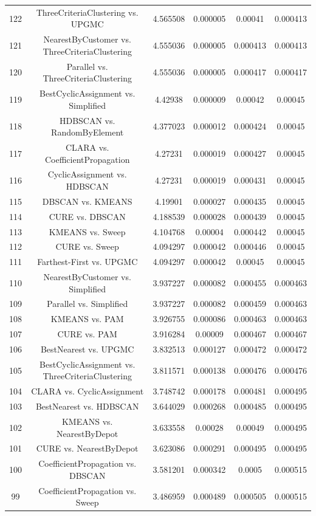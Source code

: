 \documentclass[a4paper,10pt]{article}
\begin{document}
\begin{landscape}
\begin{table}[!htp]
\begin{tabular}{cccccc}
122&ThreeCriteriaClustering vs. UPGMC&4.565508&0.000005&0.00041&0.000413\\
121&NearestByCustomer vs. ThreeCriteriaClustering&4.555036&0.000005&0.000413&0.000413\\
120&Parallel vs. ThreeCriteriaClustering&4.555036&0.000005&0.000417&0.000417\\
119&BestCyclicAssignment vs. Simplified&4.42938&0.000009&0.00042&0.00045\\
118&HDBSCAN vs. RandomByElement&4.377023&0.000012&0.000424&0.00045\\
117&CLARA vs. CoefficientPropagation&4.27231&0.000019&0.000427&0.00045\\
116&CyclicAssignment vs. HDBSCAN&4.27231&0.000019&0.000431&0.00045\\
115&DBSCAN vs. KMEANS&4.19901&0.000027&0.000435&0.00045\\
114&CURE vs. DBSCAN&4.188539&0.000028&0.000439&0.00045\\
113&KMEANS vs. Sweep&4.104768&0.00004&0.000442&0.00045\\
112&CURE vs. Sweep&4.094297&0.000042&0.000446&0.00045\\
111&Farthest-First vs. UPGMC&4.094297&0.000042&0.00045&0.00045\\
110&NearestByCustomer vs. Simplified&3.937227&0.000082&0.000455&0.000463\\
109&Parallel vs. Simplified&3.937227&0.000082&0.000459&0.000463\\
108&KMEANS vs. PAM&3.926755&0.000086&0.000463&0.000463\\
107&CURE vs. PAM&3.916284&0.00009&0.000467&0.000467\\
106&BestNearest vs. UPGMC&3.832513&0.000127&0.000472&0.000472\\
105&BestCyclicAssignment vs. ThreeCriteriaClustering&3.811571&0.000138&0.000476&0.000476\\
104&CLARA vs. CyclicAssignment&3.748742&0.000178&0.000481&0.000495\\
103&BestNearest vs. HDBSCAN&3.644029&0.000268&0.000485&0.000495\\
102&KMEANS vs. NearestByDepot&3.633558&0.00028&0.00049&0.000495\\
101&CURE vs. NearestByDepot&3.623086&0.000291&0.000495&0.000495\\
100&CoefficientPropagation vs. DBSCAN&3.581201&0.000342&0.0005&0.000515\\
99&CoefficientPropagation vs. Sweep&3.486959&0.000489&0.000505&0.000515\\

\end{tabular}
\end{table}
\end{landscape}
\end{document}
